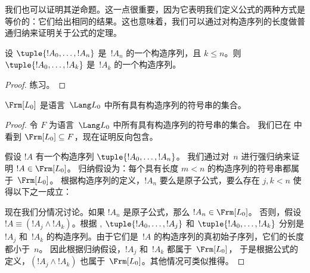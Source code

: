 \documentclass[../../../include/open-logic-section]{subfiles}
\begin{document}
我们也可以证明其逆命题。这一点很重要，因为它表明我们定义公式的两种方式是等价的：它们给出相同的结果。这也意味着，我们可以通过对构造序列的长度做普通归纳来证明关于公式的定理。

\begin{lem}
设 $\tuple{!A_0,\dotsc,!A_n}$ 是~$!A_n$ 的一个构造序列，且 $k \leq n$。则 $\tuple{!A_0,\dotsc,!A_k}$
是~$!A_k$ 的一个构造序列。
\end{lem}

\begin{proof}
练习。
\end{proof}

\begin{thm}
$\Frm[L_0]$ 是语言~$\Lang L_0$ 中所有具有构造序列的符号串的集合。
\end{thm}

\begin{proof}
令 $F$ 为语言~$\Lang L_0$ 中所有具有构造序列的符号串的集合。
我们已在  中看到
$\Frm[L_0] \subseteq F$，现在证明反向包含。

假设 $!A$ 有一个构造序列 $\tuple{!A_0,\dotsc,!A_n}$。
我们通过对~$n$ 进行强归纳来证明 $!A \in \Frm[L_0]$。
归纳假设为：每个具有长度 $m < n$ 的构造序列的符号串都属于~$\Frm[L_0]$。
根据构造序列的定义，$!A_n$ 要么是原子公式，要么存在 $j,k < n$ 使得以下之一成立：
\begin{enumerate}
\end{enumerate}
现在我们分情况讨论。如果 $!A_n$ 是原子公式，那么 $!A_n \in \Frm[L_0]$。
否则，假设 $!A \equiv
(!A_j \land !A_k)$。根据 ,
$\tuple{!A_0,\dotsc,!A_j}$ 和 $\tuple{!A_0,\dotsc,!A_k}$ 分别是
$!A_j$ 和~$!A_k$ 的构造序列。由于它们是~$!A$ 的构造序列的真初始子序列，它们的长度都小于~$n$。
因此根据归纳假设，$!A_j$ 和~$!A_k$ 都属于~$\Frm[L_0]$，
于是根据公式的定义，$(!A_j \land !A_k)$ 也属于~$\Frm[L_0]$。其他情况可类似推得。
\end{proof}
\end{document}
